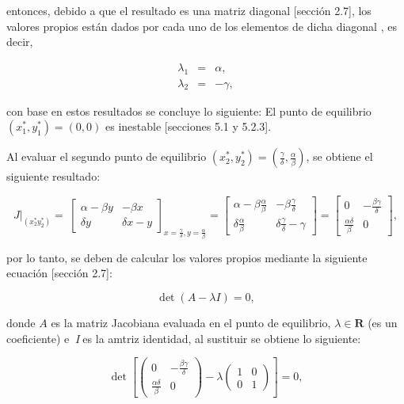 \documentclass[letterpaper,11pt]{article}
\begin{document}
entonces, debido a que el resultado es una matriz diagonal [secci\'{o}n
2.7], los valores propios est\'{a}n dados por cada uno de los elementos de
dicha diagonal , es decir, 

\begin{eqnarray*}
\lambda _{1} &=&\alpha , \\
\lambda _{2} &=&-\gamma ,
\end{eqnarray*}

con base en estos resultados se concluye lo siguiente: El punto de
equilibrio $(x_{1}^{\ast },y_{1}^{\ast })=(0,0)$ es inestable [secciones 5.1
y 5.2.3].

Al evaluar el segundo punto de equilibrio $(x_{2}^{\ast },y_{2}^{\ast })=(%
\frac{\gamma }{\delta },\frac{\alpha }{\beta })$, se obtiene el siguiente
resultado:   

\begin{equation*}
\left. J\right\vert _{(x_{2}^{\ast }y_{2}^{\ast })}=\ \left[ 
\begin{array}{cc}
\alpha -\beta y & -\beta x \\ 
\delta y & \delta x-y%
\end{array}%
\right] _{x=\frac{\gamma }{\delta },y=\frac{\alpha }{\beta }}=\left[ 
\begin{array}{cc}
\alpha -\beta \frac{\alpha }{\beta } & -\beta \frac{\gamma }{\delta } \\ 
\delta \frac{\alpha }{\beta } & \delta \frac{\gamma }{\delta }-\gamma 
\end{array}%
\right] =\left[ 
\begin{array}{cc}
0 & -\frac{\beta \gamma }{\delta } \\ 
\frac{\alpha \delta }{\beta } & 0%
\end{array}%
\right] ,
\end{equation*}

por lo tanto, se deben de calcular los valores propios mediante la siguiente
ecuaci\'{o}n [secci\'{o}n 2.7]:

\begin{equation*}
\det (A-\lambda I)=0,
\end{equation*}

donde $A$ es la matriz Jacobiana evaluada en el punto de equilibrio, $%
\lambda \in \mathbf{R}$ (es un coeficiente) e $\ I~$es la amtriz identidad,
al sustituir se obtiene lo siguiente:\ 

\begin{equation*}
\det \left[ \left( 
\begin{array}{cc}
0 & -\frac{\beta \gamma }{\delta } \\ 
\frac{\alpha \delta }{\beta } & 0%
\end{array}%
\right) -\lambda \left( 
\begin{array}{cc}
1 & 0 \\ 
0 & 1%
\end{array}%
\right) \right] =0,
\end{equation*}
\end{document}
